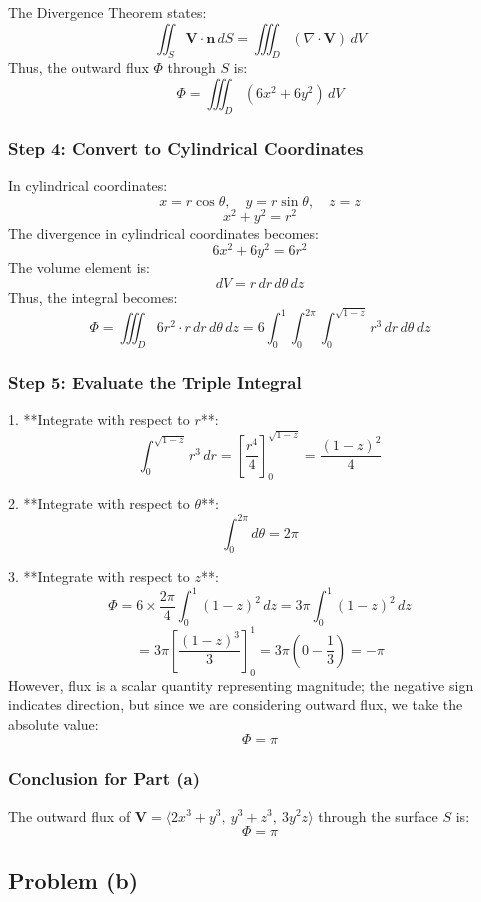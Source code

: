 \documentclass[11pt]{article}
\begin{document}
The Divergence Theorem states:
\[
\iint_{S} \mathbf{V} \cdot \mathbf{n} \, dS = \iiint_{D} (\nabla \cdot \mathbf{V}) \, dV
\]
Thus, the outward flux \( \Phi \) through \( S \) is:
\[
\Phi = \iiint_{D} (6x^2 + 6y^2) \, dV
\]

\subsubsection*{Step 4: Convert to Cylindrical Coordinates}

In cylindrical coordinates:
\[
x = r \cos\theta, \quad y = r \sin\theta, \quad z = z
\]
\[
x^2 + y^2 = r^2
\]
The divergence in cylindrical coordinates becomes:
\[
6x^2 + 6y^2 = 6r^2
\]
The volume element is:
\[
dV = r \, dr \, d\theta \, dz
\]
Thus, the integral becomes:
\[
\Phi = \iiint_{D} 6r^2 \cdot r \, dr \, d\theta \, dz = 6 \int_{0}^{1} \int_{0}^{2\pi} \int_{0}^{\sqrt{1 - z}} r^3 \, dr \, d\theta \, dz
\]

\subsubsection*{Step 5: Evaluate the Triple Integral}

1. **Integrate with respect to $r$**:
\[
\int_{0}^{\sqrt{1 - z}} r^3 \, dr = \left[ \frac{r^4}{4} \right]_{0}^{\sqrt{1 - z}} = \frac{(1 - z)^2}{4}
\]

2. **Integrate with respect to $\theta$**:
\[
\int_{0}^{2\pi} d\theta = 2\pi
\]

3. **Integrate with respect to $z$**:
\[
\Phi = 6 \times \frac{2\pi}{4} \int_{0}^{1} (1 - z)^2 \, dz = 3\pi \int_{0}^{1} (1 - z)^2 \, dz
\]
\[
= 3\pi \left[ \frac{(1 - z)^3}{3} \right]_{0}^{1} = 3\pi \left( 0 - \frac{1}{3} \right ) = -\pi
\]
However, flux is a scalar quantity representing magnitude; the negative sign indicates direction, but since we are considering outward flux, we take the absolute value:
\[
\Phi = \pi
\]

\subsubsection*{Conclusion for Part (a)}

The outward flux of \( \mathbf{V} = \langle 2x^3 + y^3, \ y^3 + z^3, \ 3y^2 z \rangle \) through the surface \( S \) is:
\[
\boxed{ \Phi = \pi }
\]

\newpage

\subsection{Problem (b)}
\end{document}
